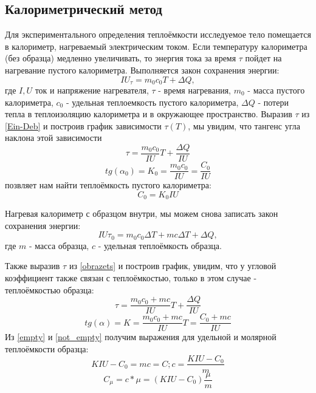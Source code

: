 \documentclass[a4paper,12pt]{article}
\begin{document}
\subsection{Калориметрический метод}
\vspace{\parindent} Для экспериментального определения теплоёмкости исследуемое тело помещается в калориметр, нагреваемый электрическим током. Если температуру калориметра (без образца) медленно увеличивать, то энергия тока за время $\tau$ пойдет на нагревание пустого калориметра. Выполняется закон сохранения энергии:
\begin{equation}\label{Ein-Deb}
IU_\tau = m_0c_0T + \Delta Q,
\end{equation}
где $I, U$ ток и напряжение нагревателя, $\tau$ - время нагревания, $m_0$ - масса пустого калориметра, $c_0$ - удельная теплоемкость пустого калориметра, $\Delta Q$ - потери тепла в теплоизоляцию калориметра и в окружающее пространство.
Выразив $\tau$ из \eqref{Ein-Deb} и построив график зависимости $\tau(T)$, мы увидим, что тангенс угла наклона этой зависимости
$$\tau = \frac{m_0c_0}{IU}T + \frac{\Delta Q}{IU}$$
\begin{equation}\label{empty}
tg(\alpha_0) = K_0 = \frac{m_0c_0}{IU} = \frac{C_0}{IU}
\end{equation}
позвляет нам найти теплоёмкость пустого калориметра: 
$$C_0 = K_0IU$$

Нагревая калориметр с образцом внутри, мы можем снова записать закон сохранения энергии:
\begin{equation}\label{obrazets}
IU\tau_0 = m_0c_0\Delta T + mc\Delta T + \Delta Q,
\end{equation}
где $m$ - масса образца, $c$ - удельная теплоёмкость образца.

Также выразив $\tau$ из \eqref{obrazets} и построив график, увидим, что у угловой коэффициент также связан с теплоёмкостью, только в этом случае - теплоёмкостью образца:
$$\tau = \frac{m_0c_0 + mc}{IU}T + \frac{\Delta Q}{IU}$$
\begin{equation}\label{not_empty}
tg(\alpha) = K = \frac{m_0c_0 + mc}{IU}T  = \frac{C_0+mc}{IU}
\end{equation}
Из \eqref{empty} и \eqref{not_empty} получим выражения для удельной и молярной теплоёмкости образца:
\begin{equation}
KIU - C_0 = mc = C; c = \frac{KIU - C_0}{m}
\end{equation}
\begin{equation}
C_\mu = c*\mu = (KIU - C_0)\frac{\mu}{m}
\end{equation}
\end{document}
